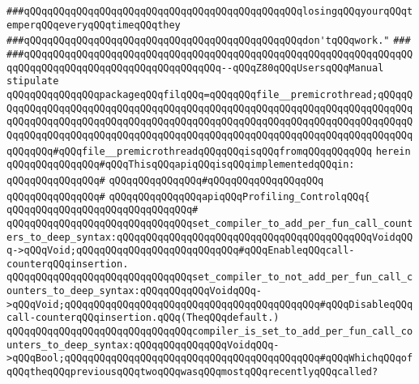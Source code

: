 \verb|###qQQqqQQqqQQqqQQqqQQqqQQqqQQqqQQqqQQqqQQqqQQqqQQqlosingqQQqyourqQQqtemperqQQqeveryqQQqtimeqQQqthey|\newline
\verb|###qQQqqQQqqQQqqQQqqQQqqQQqqQQqqQQqqQQqqQQqqQQqqQQqdon'tqQQqwork."|\newline
\verb|###|\newline
\verb|###qQQqqQQqqQQqqQQqqQQqqQQqqQQqqQQqqQQqqQQqqQQqqQQqqQQqqQQqqQQqqQQqqQQqqQQqqQQqqQQqqQQqqQQqqQQqqQQqqQQqqQQq--qQQqZ80qQQqUsersqQQqManual|\newline
\newline
\newline
\verb|stipulate|\newline
\verb|qQQqqQQqqQQqqQQqpackageqQQqfilqQQq=qQQqqQQqfile__premicrothread;qQQqqQQqqQQqqQQqqQQqqQQqqQQqqQQqqQQqqQQqqQQqqQQqqQQqqQQqqQQqqQQqqQQqqQQqqQQqqQQqqQQqqQQqqQQqqQQqqQQqqQQqqQQqqQQqqQQqqQQqqQQqqQQqqQQqqQQqqQQqqQQqqQQqqQQqqQQqqQQqqQQqqQQqqQQqqQQqqQQqqQQqqQQqqQQqqQQqqQQqqQQqqQQqqQQqqQQqqQQqqQQq#qQQqfile__premicrothreadqQQqqQQqisqQQqfromqQQqqQQqqQQq|\newline
\verb|herein|\newline
\newline
\verb|qQQqqQQqqQQqqQQq#qQQqThisqQQqapiqQQqisqQQqimplementedqQQqin:|\newline
\verb|qQQqqQQqqQQqqQQq#|\newline
\verb|qQQqqQQqqQQqqQQq#qQQqqQQqqQQqqQQqqQQq|\newline
\verb|qQQqqQQqqQQqqQQq#|\newline
\verb|qQQqqQQqqQQqqQQqapiqQQqProfiling_ControlqQQq{|\newline
\verb|qQQqqQQqqQQqqQQqqQQqqQQqqQQqqQQq#|\newline
\verb|qQQqqQQqqQQqqQQqqQQqqQQqqQQqqQQqset_compiler_to_add_per_fun_call_counters_to_deep_syntax:qQQqqQQqqQQqqQQqqQQqqQQqqQQqqQQqqQQqqQQqqQQqVoidqQQq->qQQqVoid;qQQqqQQqqQQqqQQqqQQqqQQqqQQq#qQQqEnableqQQqcall-counterqQQqinsertion.|\newline
\verb|qQQqqQQqqQQqqQQqqQQqqQQqqQQqqQQqset_compiler_to_not_add_per_fun_call_counters_to_deep_syntax:qQQqqQQqqQQqVoidqQQq->qQQqVoid;qQQqqQQqqQQqqQQqqQQqqQQqqQQqqQQqqQQqqQQqqQQq#qQQqDisableqQQqcall-counterqQQqinsertion.qQQq(TheqQQqdefault.)|\newline
\verb|qQQqqQQqqQQqqQQqqQQqqQQqqQQqqQQqcompiler_is_set_to_add_per_fun_call_counters_to_deep_syntax:qQQqqQQqqQQqqQQqVoidqQQq->qQQqBool;qQQqqQQqqQQqqQQqqQQqqQQqqQQqqQQqqQQqqQQqqQQq#qQQqWhichqQQqofqQQqtheqQQqpreviousqQQqtwoqQQqwasqQQqmostqQQqrecentlyqQQqcalled?|\newline
